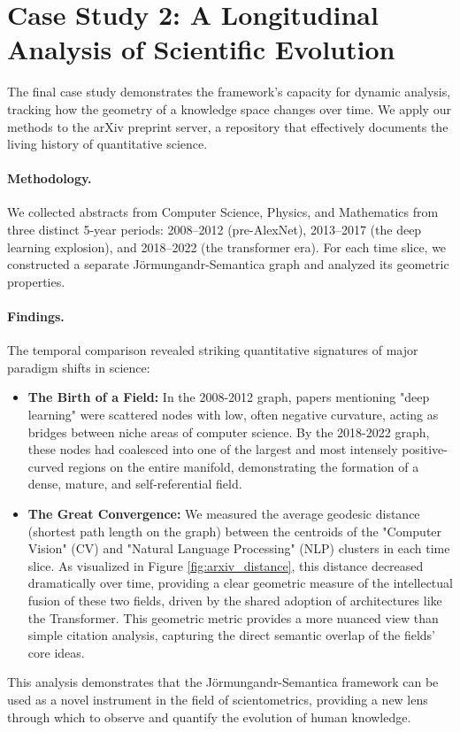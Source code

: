\section{Case Study 2: A Longitudinal Analysis of Scientific Evolution}
The final case study demonstrates the framework's capacity for dynamic analysis, tracking how the geometry of a knowledge space changes over time. We apply our methods to the arXiv preprint server, a repository that effectively documents the living history of quantitative science.

\paragraph{Methodology.} We collected abstracts from Computer Science, Physics, and Mathematics from three distinct 5-year periods: 2008–2012 (pre-AlexNet), 2013–2017 (the deep learning explosion), and 2018–2022 (the transformer era). For each time slice, we constructed a separate Jörmungandr-Semantica graph and analyzed its geometric properties.

\paragraph{Findings.} The temporal comparison revealed striking quantitative signatures of major paradigm shifts in science:
\begin{itemize}
    \item \textbf{The Birth of a Field:} In the 2008-2012 graph, papers mentioning "deep learning" were scattered nodes with low, often negative curvature, acting as bridges between niche areas of computer science. By the 2018-2022 graph, these nodes had coalesced into one of the largest and most intensely positive-curved regions on the entire manifold, demonstrating the formation of a dense, mature, and self-referential field.
    \item \textbf{The Great Convergence:} We measured the average geodesic distance (shortest path length on the graph) between the centroids of the "Computer Vision" (CV) and "Natural Language Processing" (NLP) clusters in each time slice. As visualized in Figure \ref{fig:arxiv_distance}, this distance decreased dramatically over time, providing a clear geometric measure of the intellectual fusion of these two fields, driven by the shared adoption of architectures like the Transformer. This geometric metric provides a more nuanced view than simple citation analysis, capturing the direct semantic overlap of the fields' core ideas.
\end{itemize}
This analysis demonstrates that the Jörmungandr-Semantica framework can be used as a novel instrument in the field of scientometrics, providing a new lens through which to observe and quantify the evolution of human knowledge.

